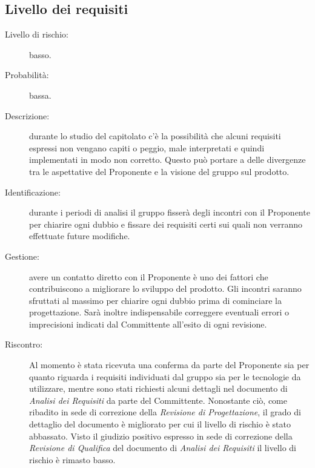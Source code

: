 \subsection{Livello dei requisiti}
\begin{description}
	\item[Livello di rischio:] basso.
	\item[Probabilità:] bassa.
	\item[Descrizione:] durante lo studio del capitolato c'è la possibilità che alcuni requisiti espressi non vengano capiti o peggio, male interpretati e quindi implementati in modo non corretto. Questo può portare a delle divergenze tra le aspettative del Proponente e la visione del gruppo sul prodotto. 
	\item[Identificazione:] durante i periodi di analisi il gruppo fisserà degli incontri con il Proponente per chiarire ogni dubbio e fissare dei requisiti certi sui quali non verranno effettuate future modifiche.
	\item[Gestione:] avere un contatto diretto con il Proponente è uno dei fattori che contribuiscono a migliorare lo sviluppo del prodotto. Gli incontri saranno sfruttati al massimo per chiarire ogni dubbio prima di cominciare la progettazione. Sarà inoltre indispensabile correggere eventuali errori o imprecisioni indicati dal Committente all'esito di ogni revisione.
	\item[Riscontro:] Al momento è stata ricevuta una conferma da parte del Proponente sia per quanto riguarda i requisiti individuati dal gruppo sia per le tecnologie da utilizzare, mentre sono stati richiesti alcuni dettagli nel documento di \textit{Analisi dei Requisiti} da parte del Committente. Nonostante ciò, come ribadito in sede di correzione della \textit{Revisione di Progettazione}, il grado di dettaglio del documento è migliorato per cui il livello di rischio è stato abbassato. Visto il giudizio positivo espresso in sede di correzione della \textit{Revisione di Qualifica} del documento di \textit{Analisi dei Requisiti} il livello di rischio è rimasto basso.
\end{description}

